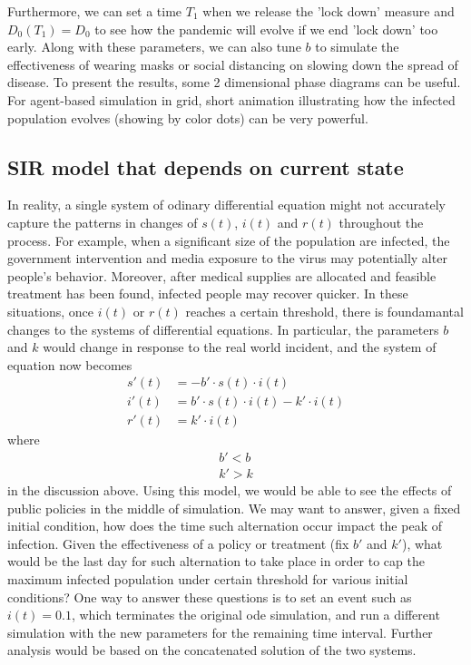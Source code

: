 \documentclass[12pt, reqno]{amsart}
\begin{document}
Furthermore, we can set a time $T_1$ when we release the 'lock down' measure and $D_0(T_1) = D_0$ to see how the pandemic will evolve if we end 'lock down' too early. Along with these parameters, we can also tune $b$ to simulate the effectiveness of wearing masks or social distancing on slowing down the spread of disease. To present the results, some 2 dimensional phase diagrams can be useful. For agent-based simulation in grid, short animation illustrating how the infected population evolves (showing by color dots) can be very powerful.

\subsection{SIR model that depends on current state}
    In reality, a single system of odinary differential equation might not accurately capture the patterns in changes of \(s(t)\), \(i(t)\) and \(r(t)\) throughout the process. For example, when a significant size of the population are infected, the government intervention and media exposure to the virus may potentially alter people's behavior. Moreover, after medical supplies are allocated and feasible treatment has been found, infected people may recover quicker. In these situations, once \(i(t)\) or \(r(t)\) reaches a certain threshold, there is foundamantal changes to the systems of differential equations. In particular, the parameters \(b\) and \(k\) would change in response to the real world incident, and the system of equation now becomes
    \begin{align*}
        s'(t) &= -b'\cdot s(t) \cdot i(t) \\
        i'(t) &= b'\cdot s(t) \cdot i(t) - k'\cdot i(t) \\
        r'(t) &= k'\cdot i(t)
    \end{align*}
where
    \begin{align*}
       b' < b \\
       k' > k
    \end{align*}
in the discussion above. Using this model, we would be able to see the effects of public policies in the middle of simulation. We may want to answer, given a fixed initial condition, how does the time such alternation occur impact the peak of infection. Given the effectiveness of a policy or treatment (fix \(b'\) and \(k'\)), what would be the last day for such alternation to take place in order to cap the maximum infected population under certain threshold for various initial conditions? One way to answer these questions is to set an event such as  \(i(t) = 0.1\), which terminates the original ode simulation, and run a different simulation with the new parameters for the remaining time interval. Further analysis would be based on the concatenated solution of the two systems.
\end{document}
